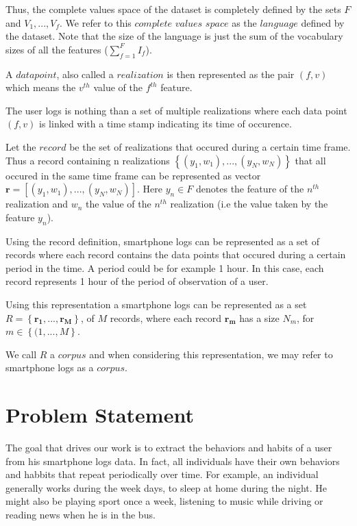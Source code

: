 Thus, the complete values space of the dataset is completely defined by the sets $F$ and $V_1,...,V_f$. We refer to this $complete$ $values$ $space$ as the $language$ defined by the dataset. Note that the size of the language is just the sum of the vocabulary sizes of all the features ($\sum_{f=1}^{F} I_f$).

A $data point$, also called a $realization$ is then represented as the pair $(f,v)$ which means the $v^{th}$ value of the $f^{th}$ feature.

The user logs is nothing than a set of multiple realizations where each data point $(f,v)$ is linked with a time stamp indicating its time of occurence.

Let the $record$ be the set of realizations that occured during a certain time frame. Thus a record containing n realizations $\left \{ (y_1,w_1),..., (y_N,w_N) \right \}$ that all occured in the same time frame can be represented as vector $\mathbf{r} = [(y_1,w_1),..., (y_N,w_N)]$. Here $y_{n} \in F$ denotes the feature of the $n^{th}$ realization and $w_n$ the value of the $n^{th}$ realization (i.e the value taken by the feature $y_n$).

Using the record definition, smartphone logs can be represented as a set of records where each record contains the data points that occured during a certain period in the time. A period could be for example 1 hour. In this case, each record represents 1 hour of the period of observation of a user.

Using this representation a smartphone logs can be represented as a set $R = \left \{ \mathbf{r_1},...,\mathbf{r_M} \right \} $, of $M$ records, where each record $\mathbf{r_m}$ has a size $N_m$, for $m \in \left \{ (1,...,M \right \}$.

We call $R$ a $corpus$ and when considering this representation, we may refer to smartphone logs as a $corpus$.

\section{Problem Statement}
The goal that drives our work is to extract the behaviors and habits of a user from his smartphone logs data.
In fact, all individuals have their own behaviors and habbits that repeat periodically over time. For example, an individual generally works during the week days, to sleep at home during the night. He might also be playing sport once a week, listening to music while driving or reading news when he is in the bus.

